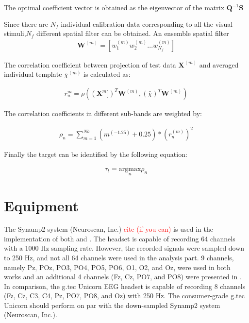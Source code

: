 The optimal coefficient vector is obtained as the eigenvector of the matrix $\mathbf{Q}^{-1}\mathbf{S}$ 

Since there are $N_{f}$ individual calibration data corresponding to all the visual stimuli,$N_{f}$ different spatial filter can be obtained. An ensemble spatial filter 
\begin{equation}\label{eq7}
\begin{split}
\mathbf{W}^{(m)} = [w_{1}^{(m)} w_{2}^{(m)} ... w_{N_{f}}^{(m)}]
\end{split}
\end{equation}

The correlation coefficient between projection of test data $\mathbf{X}^{(m)}$ and averaged individual template $\bar{\chi}^{(m)}$ is calculated as:

\begin{equation}\label{eq8}
\begin{split}
r_{n}^{m} = \rho ((\mathbf{X}^{m}])^T \mathbf{W}^{(m)},(\bar{\chi})^T \mathbf{W}^{(m)})
\end{split}
\end{equation}

The correlation coefficients in different sub-bands are weighted by:

\begin{equation}\label{eq9}
\begin{split}
\rho _{n} = \sum_{m=1}^{Nb} (m^{(-1.25)} + 0.25) * (r_{n}^{(m)})^2 
\end{split}
\end{equation}

Finally the target can be identified by the following equation:

\begin{equation}\label{eq10}
\begin{split}
\tau _{t} = \underset{n}{\text{argmax}} \rho _{n}
\end{split}
\end{equation}



\section{Equipment}

The Synamp2 system (Neuroscan, Inc.) \textcolor{red}{cite (if you can)} is used in the implementation of both \cite{nakanishi2017enhancing} and \cite{xu2020implementing}. 
The headset is capable of recording 64 channels with a 1000 Hz sampling rate.
However, the recorded signals were sampled down to 250 Hz, and not all 64 channels were used in the analysis part.
9 channels, namely Pz, POz, PO3, PO4, PO5, PO6, O1, O2, and Oz, were used in both works and an additional 4 channels (Fz, Cz, PO7, and PO8) were presented in \cite{xu2020implementing}. 
In comparison, the g.tec Unicorn EEG headset is capable of recording 8 channels (Fz, Cz, C3, C4, Pz, PO7, PO8, and Oz) with 250 Hz.
The consumer-grade g.tec Unicorn should perform on par with the down-sampled Synamp2 system (Neuroscan, Inc.).